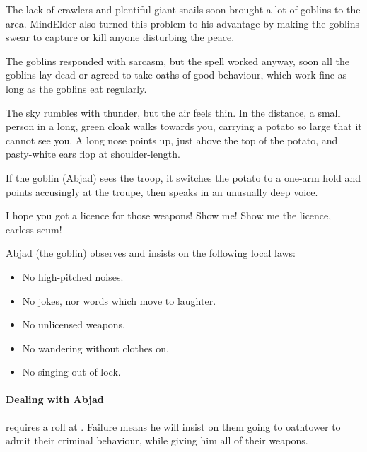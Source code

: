 
\begin{exampletext}
  The lack of \glspl{crawler} and plentiful giant snails soon brought a lot of goblins to the area.
  \Gls{MindElder} also turned this problem to his advantage by making the goblins swear to capture or kill anyone disturbing the peace.

  The goblins responded with sarcasm, but the spell worked anyway, soon all the goblins lay dead or agreed to take oaths of good behaviour, which work fine as long as the goblins eat regularly.
\end{exampletext}

\begin{boxtext}
  The sky rumbles with thunder, but the air feels thin.
  In the distance, a small person in a long, green cloak walks towards you, carrying a potato so large that it cannot see you.
  A long nose points up, just above the top of the potato, and pasty-white ears flop at shoulder-length.
\end{boxtext}

If the goblin (Abjad) sees the troop, it switches the potato to a one-arm hold and points accusingly at the troupe, then speaks in an unusually deep voice.

\begin{speechtext}
  I hope you got a licence for those weapons!
  Show me!
  Show me the licence, earless scum!
\end{speechtext}

Abjad (the goblin) observes and insists on the following local laws:

\begin{itemize}
  \item
  No high-pitched noises.
  \item
  No jokes, nor words which move to laughter.
  \item
  No unlicensed weapons.
  \item
  No wandering without clothes on.
  \item
  No singing out-of-lock.
\end{itemize}


\paragraph{Dealing with Abjad}
requires a  roll at \tn[9].
Failure means he will insist on them going to \gls{oathtower} to admit their criminal behaviour, while giving him all of their \glspl{weapon}.

